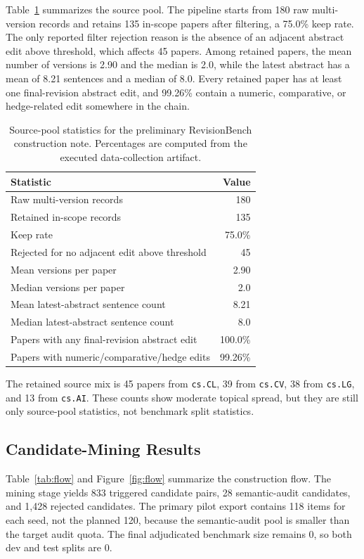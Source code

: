 \documentclass{article}
\begin{document}
Table~\ref{tab:source} summarizes the source pool. The pipeline starts from 180 raw multi-version records and retains 135 in-scope papers after filtering, a 75.0\% keep rate. The only reported filter rejection reason is the absence of an adjacent abstract edit above threshold, which affects 45 papers. Among retained papers, the mean number of versions is 2.90 and the median is 2.0, while the latest abstract has a mean of 8.21 sentences and a median of 8.0. Every retained paper has at least one final-revision abstract edit, and 99.26\% contain a numeric, comparative, or hedge-related edit somewhere in the chain.

\begin{table}[t]
\caption{Source-pool statistics for the preliminary RevisionBench construction note. Percentages are computed from the executed data-collection artifact.}
\label{tab:source}
\centering
\begin{tabular}{lr}
\toprule
Statistic & Value \\
\midrule
Raw multi-version records & 180 \\
Retained in-scope records & 135 \\
Keep rate & 75.0\% \\
Rejected for no adjacent edit above threshold & 45 \\
Mean versions per paper & 2.90 \\
Median versions per paper & 2.0 \\
Mean latest-abstract sentence count & 8.21 \\
Median latest-abstract sentence count & 8.0 \\
Papers with any final-revision abstract edit & 100.0\% \\
Papers with numeric/comparative/hedge edits & 99.26\% \\
\bottomrule
\end{tabular}
\end{table}

The retained source mix is 45 papers from \texttt{cs.CL}, 39 from \texttt{cs.CV}, 38 from \texttt{cs.LG}, and 13 from \texttt{cs.AI}. These counts show moderate topical spread, but they are still only source-pool statistics, not benchmark split statistics.

\subsection{Candidate-Mining Results}

Table~\ref{tab:flow} and Figure~\ref{fig:flow} summarize the construction flow. The mining stage yields 833 triggered candidate pairs, 28 semantic-audit candidates, and 1{,}428 rejected candidates. The primary pilot export contains 118 items for each seed, not the planned 120, because the semantic-audit pool is smaller than the target audit quota. The final adjudicated benchmark size remains 0, so both dev and test splits are 0.
\end{document}
